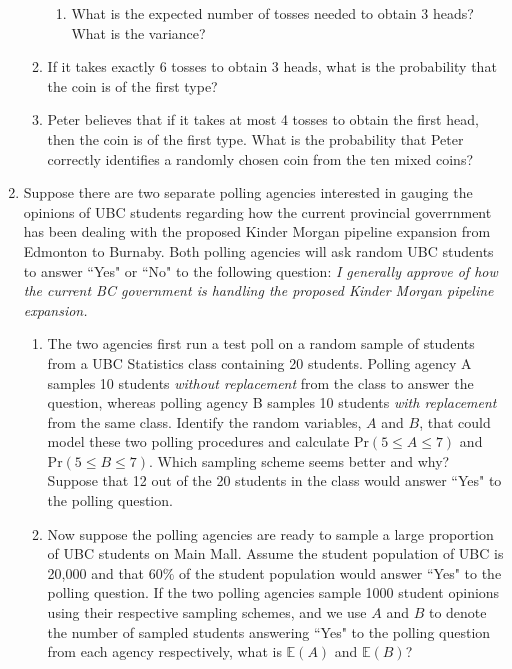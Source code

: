 \documentclass[11pt]{article}
\newcommand{\pr}{\text{Pr}}
\newcommand{\e}{\mathbb{E}}
\begin{document}
\begin{enumerate}[label=\textbf{Q \arabic*:},start=1]
\begin{enumerate}
\begin{enumerate}
    \item What is the expected number of tosses needed to obtain 3 heads? What is the variance?\\

  \end{enumerate}

  \item If it takes exactly 6 tosses to obtain 3 heads, what is the probability that the coin is of the first type?\\



  \item Peter believes that if it takes at most 4 tosses to obtain the first head, then the coin is of the first type. What is the probability that Peter correctly identifies a randomly chosen coin from the ten mixed coins?\\

\end{enumerate}



\newpage


\item 
Suppose there are two separate polling agencies interested in gauging the opinions of UBC students regarding how the current provincial goverrnment has been dealing with the proposed Kinder Morgan pipeline expansion from Edmonton to Burnaby. Both polling agencies will ask random UBC students to answer ``Yes" or ``No" to the following question: {\em I generally approve of how the current BC government is handling the proposed Kinder Morgan pipeline expansion.}

\begin{enumerate}
  \item The two agencies first run a test poll on a random sample of students from a UBC Statistics class containing 20 students. Polling agency A samples 10 students {\em without replacement} from the class to answer the question, whereas polling agency B samples 10 students {\em with replacement} from the same class. Identify the random variables, $A$ and $B$, that could model these two polling procedures and calculate $\pr(5\leq A\leq 7)$ and $\pr(5\leq B\leq 7)$. Which sampling scheme seems better and why? Suppose that 12 out of the 20 students in the class would answer ``Yes" to the polling question.\\

  \item Now suppose the polling agencies are ready to sample a large proportion of UBC students on Main Mall. Assume the student population of UBC is 20,000 and that $60\%$ of the student population would answer ``Yes" to the polling question. If the two polling agencies sample 1000 student opinions using their respective sampling schemes, and we use $A$ and $B$ to denote the number of sampled students answering ``Yes" to the polling question from each agency respectively, what is $\e(A)$ and $\e(B)$?\\


\end{enumerate}
\end{enumerate}
\end{document}
